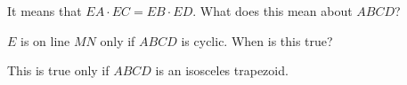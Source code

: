 







It means that $EA\cdot EC=EB\cdot ED$. What does this mean about $ABCD$?









$E$ is on line $MN$ only if $ABCD$ is cyclic. When is this true?





This is true only if $ABCD$ is an isosceles trapezoid.

